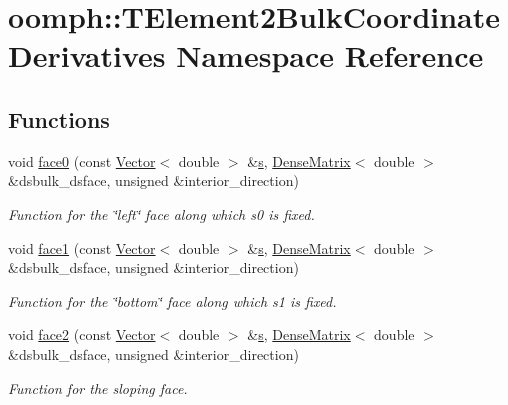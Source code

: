 \hypertarget{namespaceoomph_1_1TElement2BulkCoordinateDerivatives}{}\section{oomph\+:\+:T\+Element2\+Bulk\+Coordinate\+Derivatives Namespace Reference}
\label{namespaceoomph_1_1TElement2BulkCoordinateDerivatives}
\subsection*{Functions}
\begin{DoxyCompactItemize}
\item 
void \hyperlink{namespaceoomph_1_1TElement2BulkCoordinateDerivatives_a594aa906862feecca4a94fb1b5828539}{face0} (const \hyperlink{classoomph_1_1Vector}{Vector}$<$ double $>$ \&\hyperlink{cfortran_8h_ab7123126e4885ef647dd9c6e3807a21c}{s}, \hyperlink{classoomph_1_1DenseMatrix}{Dense\+Matrix}$<$ double $>$ \&dsbulk\+\_\+dsface, unsigned \&interior\+\_\+direction)
\begin{DoxyCompactList}\small\item\em Function for the \char`\"{}left\char`\"{} face along which s0 is fixed. \end{DoxyCompactList}\item 
void \hyperlink{namespaceoomph_1_1TElement2BulkCoordinateDerivatives_ac0a6a95ed65ef054e597a3defc274644}{face1} (const \hyperlink{classoomph_1_1Vector}{Vector}$<$ double $>$ \&\hyperlink{cfortran_8h_ab7123126e4885ef647dd9c6e3807a21c}{s}, \hyperlink{classoomph_1_1DenseMatrix}{Dense\+Matrix}$<$ double $>$ \&dsbulk\+\_\+dsface, unsigned \&interior\+\_\+direction)
\begin{DoxyCompactList}\small\item\em Function for the \char`\"{}bottom\char`\"{} face along which s1 is fixed. \end{DoxyCompactList}\item 
void \hyperlink{namespaceoomph_1_1TElement2BulkCoordinateDerivatives_ac9d53ae399bc8c272d584004bca77b9d}{face2} (const \hyperlink{classoomph_1_1Vector}{Vector}$<$ double $>$ \&\hyperlink{cfortran_8h_ab7123126e4885ef647dd9c6e3807a21c}{s}, \hyperlink{classoomph_1_1DenseMatrix}{Dense\+Matrix}$<$ double $>$ \&dsbulk\+\_\+dsface, unsigned \&interior\+\_\+direction)
\begin{DoxyCompactList}\small\item\em Function for the sloping face. \end{DoxyCompactList}\end{DoxyCompactItemize}


